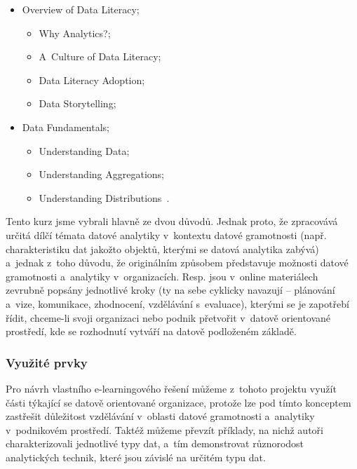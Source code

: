 \begin{itemize}
\tightlist
\item
  Overview of Data Literacy;

  \begin{itemize}
  \tightlist
  \item
    Why Analytics?;
  \item
    A~Culture of Data Literacy;
  \item
    Data Literacy Adoption;
  \item
    Data Storytelling;
  \end{itemize}
\item
  Data Fundamentals;

  \begin{itemize}
  \tightlist
  \item
    Understanding Data;
  \item
    Understanding Aggregations;
  \item
    Understanding Distributions~\parencite{course3}.
  \end{itemize}
\end{itemize}

Tento kurz jsme vybrali hlavně ze dvou důvodů. Jednak proto, že zpracovává určitá dílčí témata datové analytiky v~kontextu datové gramotnosti (např. charakteristiku dat jakožto objektů, kterými se datová analytika zabývá) a~jednak z~toho důvodu, že originálním způsobem představuje možnosti datové gramotnosti a~analytiky v~organizacích. Resp. jsou v~online materiálech zevrubně popsány jednotlivé kroky (ty na sebe cyklicky navazují -- plánování a~vize, komunikace, zhodnocení, vzdělávání s~evaluace), kterými se je zapotřebí řídit, chceme-li svoji organizaci nebo podnik přetvořit v~datově orientované prostředí, kde se rozhodnutí vytváří na datově podloženém základě.

\hypertarget{vyuux17eituxe9-prvky-2}{%
\subsubsection{Využité prvky}\label{vyuux17eituxe9-prvky-2}}

Pro návrh vlastního e-learningového řešení můžeme z~tohoto projektu využít části týkající se datově orientované organizace, protože lze pod tímto konceptem zastřešit důležitost vzdělávání v~oblasti datové gramotnosti a~analytiky v~podnikovém prostředí. Taktéž můžeme převzít příklady, na nichž autoři charakterizovali jednotlivé typy dat, a~tím demonstrovat různorodost analytických technik, které jsou závislé na určitém typu dat.

